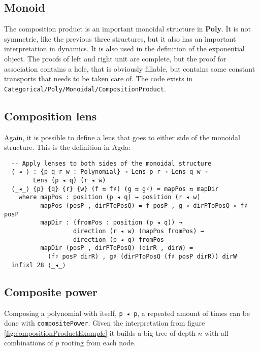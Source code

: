\subsection{Monoid}
The composition product is an important monoidal structure in \textbf{Poly}. It is not symmetric, like the previous three structures, but it also has an important interpretation in dynamics. It is also used in the definition of the exponential object.
The proofs of left and right unit are complete, but the proof for association contains a hole, that is obviously fillable, but contains some constant transports that needs to be taken care of. %
The code exists in \texttt{Categorical/Poly/Monoidal/CompositionProduct}.

\subsection{Composition lens}

Again, it is possible to define a lens that goes to either side of the monoidal structure. This is the definition in Agda:

\begin{verbatim}
  -- Apply lenses to both sides of the monoidal structure
  ⟨_◂_⟩ : {p q r w : Polynomial} → Lens p r → Lens q w → 
        Lens (p ◂ q) (r ◂ w)
  ⟨_◂_⟩ {p} {q} {r} {w} (f ⇆ f♯) (g ⇆ g♯) = mapPos ⇆ mapDir
    where mapPos : position (p ◂ q) → position (r ◂ w)
          mapPos (posP , dirPToPosQ) = f posP , g ∘ dirPToPosQ ∘ f♯ posP
          mapDir : (fromPos : position (p ◂ q)) → 
                   direction (r ◂ w) (mapPos fromPos) → 
                   direction (p ◂ q) fromPos
          mapDir (posP , dirPToPosQ) (dirR , dirW) = 
            (f♯ posP dirR) , g♯ (dirPToPosQ (f♯ posP dirR)) dirW
  infixl 28 ⟨_◂_⟩
\end{verbatim}

\subsection{Composite power}
Composing a polynomial with itself, \texttt{p ◂ p}, a repeated amount of times can be done with \texttt{compositePower}.
Given the interpretation from figure \ref{fig:compositionProductExample} it builds a big tree of depth $n$ with all combinations of $p$ rooting from each node. 

